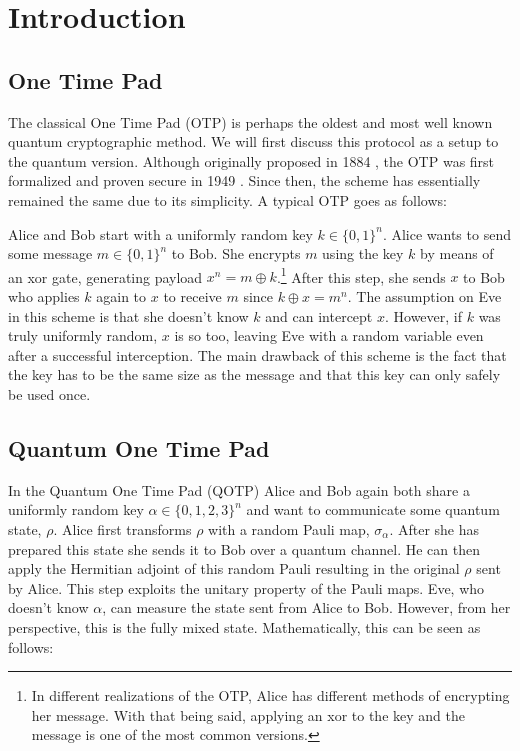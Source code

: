 \documentclass[]{article}
\title{}
\author{}
\begin{document}
\maketitle

\begin{abstract}

\end{abstract}

\section{Introduction}


\subsection{One Time Pad}

The classical One Time Pad (OTP) is perhaps the oldest and most well known quantum cryptographic method. We will first discuss this protocol as a setup to the quantum version. Although originally proposed in 1884 \cite{Markoff2011}, the OTP was first formalized and proven secure in 1949 \cite{Shannon1949}. Since then, the scheme has essentially remained the same due to its simplicity. A typical OTP goes as follows:

Alice and Bob start with a uniformly random key $k \in \{0,1\}^n$. Alice wants to send some message $m \in \{0,1\}^n$ to Bob. She encrypts $m$ using the key $k$ by means of an xor gate, generating payload $x^n = m \oplus k$.\footnote{In different realizations of the OTP, Alice has different methods of encrypting her message. With that being said, applying an xor to the key and the message is one of the most common versions.} After this step, she sends $x$ to Bob who applies $k$ again to $x$ to receive $m$ since $k \oplus x = m^n$. The assumption on Eve in this scheme is that she doesn't know $k$ and can intercept $x$. However, if $k$ was truly uniformly random, $x$ is so too, leaving Eve with a random variable even after a successful interception. The main drawback of this scheme is the fact that the key has to be the same size as the message and that this key can only safely be used once.

\subsection{Quantum One Time Pad}

In the Quantum One Time Pad (QOTP) Alice and Bob again both share a uniformly random key $ \alpha \in \{0,1,2,3\}^n$ and want to communicate some quantum state, $\rho$. Alice first transforms $\rho$ with a random Pauli map, $\sigma_\alpha$. After she has prepared this state she sends it to Bob over a quantum channel. He can then apply the Hermitian adjoint of this random Pauli resulting in the original $\rho$ sent by Alice. This step exploits the unitary property of the Pauli maps. Eve, who doesn't know $\alpha$, can measure the state sent from Alice to Bob. However, from her perspective, this is the fully mixed state. Mathematically, this can be seen as follows:
\end{document}
